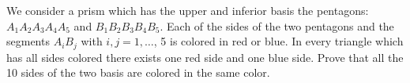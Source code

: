 We consider a prism which has the upper and inferior basis the pentagons: $A_{1}A_{2}A_{3}A_{4}A_{5}$ and $B_{1}B_{2}B_{3}B_{4}B_{5}$. Each of the sides of the two pentagons and the segments $A_{i}B_{j}$ with $i,j=1,\ldots$, 5
 is colored in red or blue. In every triangle which has all sides 
colored there exists one red side and one blue side. Prove that all the 
10 sides of the two basis are colored in the same color.
